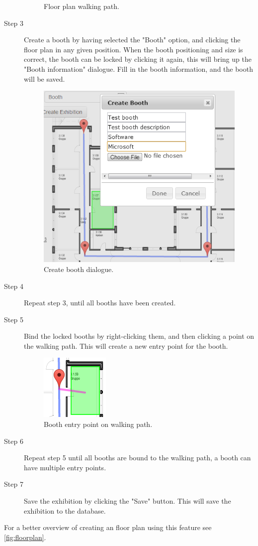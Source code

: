 \begin{description}
\begin{figure}[H]
		\caption{Floor plan walking path.\label{fig:websitestep2}}
	\end{figure}
	\item[Step 3] Create a booth by having selected the "Booth" option, and clicking the floor plan in any given position. When the booth positioning and size is correct, the booth can be locked by clicking it again, this will bring up the "Booth information" dialogue. Fill in the booth information, and the booth will be saved.
	\begin{figure}[H]
		\centering
		\includegraphics[scale=0.5]{img/website/step4.png}
		\caption{Create booth dialogue.\label{fig:websitestep3}}
	\end{figure}
	\item[Step 4] Repeat step 3, until all booths have been created.
	\item[Step 5] Bind the locked booths by right-clicking them, and then clicking a point on the walking path. This will create a new entry point for the booth.
	\begin{figure}[H]
		\centering
		\includegraphics[scale=0.5]{img/website/step5.png}
		\caption{Booth entry point on walking path.\label{fig:websitestep5}}
	\end{figure}
	\item[Step 6] Repeat step 5 until all booths are bound to the walking path, a booth can have multiple entry points.
	\item[Step 7] Save the exhibition by clicking the "Save" button. This will save the exhibition to the database.
\end{description}
For a better overview of creating an floor plan using this feature see \autoref{fig:floorplan}.

